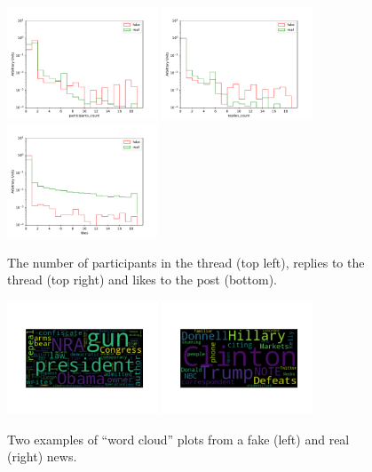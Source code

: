 \documentclass[a4paper,12pt]{article} %
\begin{document}
\begin{figure}[h!]
\caption{The number of participants in the thread (top left), replies to the thread (top right)
and likes to the post (bottom). \label{fig:post_feedback}}
\begin{center}
\includegraphics[width=0.4\textwidth]{plots/participants_count} \hspace{0.2cm}
\includegraphics[width=0.4\textwidth]{plots/replies_count} \\
\includegraphics[width=0.4\textwidth]{plots/likes}
\end{center}
\end{figure}

\begin{figure}[h!]
\caption{Two examples of ``word cloud'' plots from a fake (left) and real (right) news. \label{fig:wcloud}}
\begin{center}
\includegraphics[width=0.4\textwidth]{plots/wcloud_fake} \hspace{0.2cm}
\includegraphics[width=0.4\textwidth]{plots/wcloud_real}
\end{center}
\end{figure}
\end{document}
